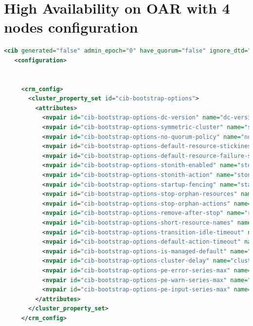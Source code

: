 \documentclass[a4paper,10pt]{report}
\begin{document}
\section {High Availability on OAR with 4 nodes configuration}
\begin{lstlisting}[language=xml]
<cib generated="false" admin_epoch="0" have_quorum="false" ignore_dtd="false" num_peers="1" cib_feature_revision="2.0" epoch="72" num_updates="1" cib-last-written="Wed Jul 22 13:16:03 2009" ccm_transition="1">
   <configuration>


     <crm_config>
       <cluster_property_set id="cib-bootstrap-options">
         <attributes>
           <nvpair id="cib-bootstrap-options-dc-version" name="dc-version" value="2.1.3-node: 552305612591183b1628baa5bc6e903e0f1e26a3"/>
           <nvpair id="cib-bootstrap-options-symmetric-cluster" name="symmetric-cluster" value="false"/>
           <nvpair id="cib-bootstrap-options-no-quorum-policy" name="no-quorum-policy" value="ignore"/>
           <nvpair id="cib-bootstrap-options-default-resource-stickiness" name="default-resource-stickiness" value="0"/>
           <nvpair id="cib-bootstrap-options-default-resource-failure-stickiness" name="default-resource-failure-stickiness" value="0"/>
           <nvpair id="cib-bootstrap-options-stonith-enabled" name="stonith-enabled" value="false"/>
           <nvpair id="cib-bootstrap-options-stonith-action" name="stonith-action" value="reboot"/>
           <nvpair id="cib-bootstrap-options-startup-fencing" name="startup-fencing" value="true"/>
           <nvpair id="cib-bootstrap-options-stop-orphan-resources" name="stop-orphan-resources" value="true"/>
           <nvpair id="cib-bootstrap-options-stop-orphan-actions" name="stop-orphan-actions" value="true"/>
           <nvpair id="cib-bootstrap-options-remove-after-stop" name="remove-after-stop" value="false"/>
           <nvpair id="cib-bootstrap-options-short-resource-names" name="short-resource-names" value="true"/>
           <nvpair id="cib-bootstrap-options-transition-idle-timeout" name="transition-idle-timeout" value="5min"/>
           <nvpair id="cib-bootstrap-options-default-action-timeout" name="default-action-timeout" value="20s"/>
           <nvpair id="cib-bootstrap-options-is-managed-default" name="is-managed-default" value="true"/>
           <nvpair id="cib-bootstrap-options-cluster-delay" name="cluster-delay" value="60s"/>
           <nvpair id="cib-bootstrap-options-pe-error-series-max" name="pe-error-series-max" value="-1"/>
           <nvpair id="cib-bootstrap-options-pe-warn-series-max" name="pe-warn-series-max" value="-1"/>
           <nvpair id="cib-bootstrap-options-pe-input-series-max" name="pe-input-series-max" value="-1"/>
         </attributes>
       </cluster_property_set>
     </crm_config>





\end{lstlisting}
\end{document}
